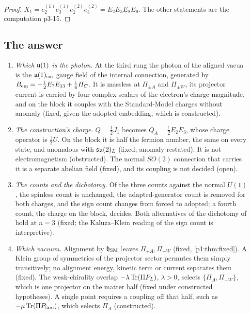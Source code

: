 \begin{proof}
$X_1=e^{(1)}_2e^{(1)}_3e^{(2)}_2e^{(2)}_3=E_2E_3E_8E_9$. The other statements are the computation p3-15.
\end{proof}

\subsection{The answer}
\label{p3:sec:answer}

\begin{enumerate}[label=(\alph*),leftmargin=2.2em]
\item \emph{Which $\mathfrak{u}(1)$ is the photon.} At the third rung the photon of the aligned vacua is the $\mathfrak{u}(1)_{\rm em}$ gauge field of the internal connection, generated by
$B_{\rm em}=-\tfrac12E_7E_{13}+\tfrac16H_C$. It is massless at $\Pi_{\pm A}$ and $\Pi_{\pm W}$, its projector current is carried by four complex scalars of the electron's
charge magnitude, and on the block it couples with the Standard-Model charges without anomaly (fixed, given the adopted embedding, which is constructed).
\item \emph{The construction's charge.} $Q=\tfrac12J_1$ becomes $Q_A=\tfrac12E_2E_3$, whose charge operator is $\tfrac12U$. On the block it is half the fermion number, the
same on every state, and anomalous with $\mathfrak{su}(2)_L$ (fixed; anomaly restated). It is not electromagnetism (obstructed). The normal $SO(2)$ connection that carries it is a
separate abelian field (fixed), and its coupling is not decided (open).
\item \emph{The counts and the dichotomy.} Of the three counts against the normal $U(1)$, the spinless count is unchanged, the adapted-generator count is removed for both
charges, and the sign count changes from forced to adopted; a fourth count, the charge on the block, decides. Both alternatives of the dichotomy of
\cite[Section~25]{ES17} hold at $n=3$ (fixed; the Kaluza--Klein reading of the sign count is interpretive).
\item \emph{Which vacuum.} Alignment by $\mathfrak h_{\rm SM}$ leaves $\Pi_{\pm A},\Pi_{\pm W}$ (fixed, \cref{p1:thm:fixed}). A Klein group of symmetries of the projector sector
permutes them simply transitively; no alignment energy, kinetic term or current separates them (fixed). The weak-chirality overlap $-\lambda\operatorname{Tr}(\Pi P_L)$, $\lambda>0$, selects
$\{\Pi_A,\Pi_{-W}\}$, which is one projector on the matter half (fixed under constructed hypotheses). A single point requires a coupling off that half, such as
$-\mu\operatorname{Tr}(\Pi P_{\rm fam})$, which selects $\Pi_A$ (constructed).

\end{enumerate}
